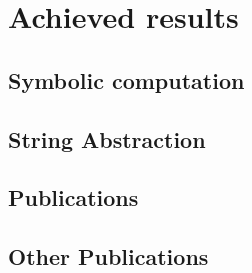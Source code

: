 \chapter{Achieved results}
\label{ch:results}


\section{Symbolic computation}

\section{String Abstraction}

\section{Publications}

\section{Other Publications}

